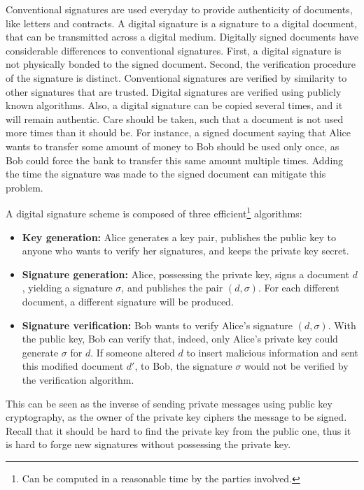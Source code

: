 \documentclass{ufsctex/ufsctex}
\begin{document}
Conventional signatures are used everyday to provide authenticity of documents,
like letters and contracts. A digital signature is a signature to a digital
document, that can be transmitted across a digital medium. Digitally signed
documents have considerable differences to conventional signatures. First, a
digital signature is not physically bonded to the signed document.  Second, the
verification procedure of the signature is distinct. Conventional signatures
are verified by similarity to other signatures that are trusted. Digital
signatures are verified using publicly known algorithms. Also, a digital
signature can be copied several times, and it will remain authentic. Care
should be taken, such that a document is not used more times than it should be.
For instance, a signed document saying that Alice wants to transfer some amount
of money to Bob should be used only once, as Bob could force the bank to
transfer this same amount multiple times. Adding the time the signature was
made to the signed document can mitigate this problem.

A digital signature scheme is composed of three efficient\footnote{Can be
computed in a reasonable time by the parties involved.} algorithms:

\begin{itemize}

	\item \textbf{Key generation:} Alice generates a key pair, publishes the
	public key to anyone who wants to verify her signatures, and keeps the
	private key secret.

	\item \textbf{Signature generation:} Alice, possessing the private key,
	signs a document $d$, yielding a signature $\sigma$, and publishes the pair
	$(d, \sigma)$. For each different document, a different signature will be
	produced.

	\item \textbf{Signature verification:} Bob wants to verify Alice's
	signature $(d, \sigma)$. With the public key, Bob can verify that, indeed,
	only Alice's private key could generate $\sigma$ for $d$. If someone
	altered $d$ to insert malicious information and sent this modified document
	$d'$, to Bob, the signature $\sigma$ would not be verified by the
	verification algorithm.

\end{itemize}

This can be seen as the inverse of sending private messages using public key
cryptography, as the owner of the private key ciphers the message to be signed.
Recall that it should be hard to find the private key from the public one, thus
it is hard to forge new signatures without possessing the private key.
\end{document}
